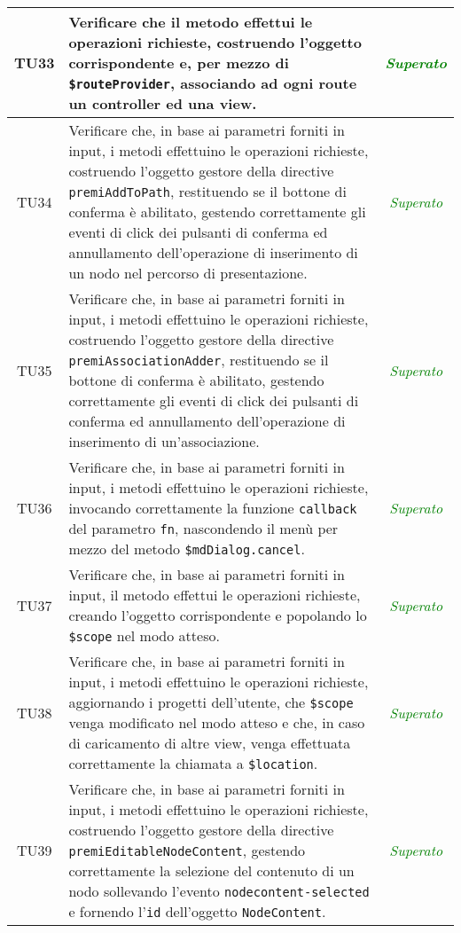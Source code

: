 \begin{longtable}{|c|>{}m{8cm}|c|}
\hypertarget{TU33}{TU33} & Verificare che il metodo effettui le operazioni richieste, costruendo l’oggetto corrispondente e, per mezzo di \texttt{\$routeProvider}, associando ad ogni route un controller ed una view\finaleTestUnita{}. & \textcolor{Green}{\textit{Superato}}\\ \hline
\hypertarget{TU34}{TU34} & Verificare che, in base ai parametri forniti in input, i metodi effettuino le operazioni richieste, costruendo l'oggetto gestore della directive \texttt{premiAddToPath}, restituendo se il bottone di conferma è abilitato, gestendo correttamente gli eventi di click dei pulsanti di conferma ed annullamento dell'operazione di inserimento di un nodo nel percorso di presentazione\finaleTestUnita{}. & \textcolor{Green}{\textit{Superato}}\\ \hline
\hypertarget{TU35}{TU35} & Verificare che, in base ai parametri forniti in input, i metodi effettuino le operazioni richieste, costruendo l'oggetto gestore della directive \texttt{premiAssociationAdder}, restituendo se il bottone di conferma è abilitato, gestendo correttamente gli eventi di click dei pulsanti di conferma ed annullamento dell'operazione di inserimento di un'associazione\finaleTestUnita{}. & \textcolor{Green}{\textit{Superato}}\\ \hline
\hypertarget{TU36}{TU36} & Verificare che, in base ai parametri forniti in input, i metodi effettuino le operazioni richieste, invocando correttamente la funzione \texttt{callback} del parametro \texttt{fn}, nascondendo il menù per mezzo del metodo \texttt{\$mdDialog.cancel}\finaleTestUnita{}. & \textcolor{Green}{\textit{Superato}}\\ \hline
\hypertarget{TU37}{TU37} & Verificare che, in base ai parametri forniti in input, il metodo effettui le operazioni richieste, creando l'oggetto corrispondente e popolando lo \texttt{\$scope} nel modo atteso\finaleTestUnita{}. & \textcolor{Green}{\textit{Superato}}\\ \hline
\hypertarget{TU38}{TU38} & Verificare che, in base ai parametri forniti in input, i metodi effettuino le operazioni richieste, aggiornando i progetti dell'utente, che \texttt{\$scope} venga modificato nel modo atteso e che, in caso di caricamento di altre view, venga effettuata correttamente la chiamata a \texttt{\$location}\finaleTestUnita{}. & \textcolor{Green}{\textit{Superato}}\\ \hline
\hypertarget{TU39}{TU39} & Verificare che, in base ai parametri forniti in input, i metodi effettuino le operazioni richieste, costruendo l'oggetto gestore della directive \texttt{premiEditableNodeContent}, gestendo correttamente la selezione del contenuto di un nodo sollevando l'evento \texttt{nodecontent-selected} e fornendo l'\texttt{id} dell'oggetto \texttt{NodeContent}\finaleTestUnita{}. & \textcolor{Green}{\textit{Superato}}\\ \hline

\end{longtable}

